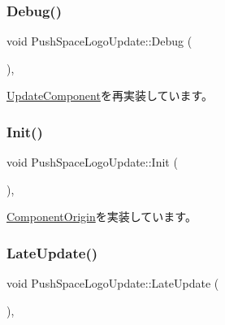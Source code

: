\subsubsection{\texorpdfstring{Debug()}{Debug()}}
{\footnotesize\ttfamily void Push\+Space\+Logo\+Update\+::\+Debug (\begin{DoxyParamCaption}{ }\end{DoxyParamCaption})\hspace{0.3cm}{\ttfamily [override]}, {\ttfamily [virtual]}}



\mbox{\hyperlink{class_update_component_a636b21061765a1101600c3ad70fadeac}{Update\+Component}}を再実装しています。

\mbox{\label{class_push_space_logo_update_a9c165604160c012b429c1db1d67ffb2a}} 
\subsubsection{\texorpdfstring{Init()}{Init()}}
{\footnotesize\ttfamily void Push\+Space\+Logo\+Update\+::\+Init (\begin{DoxyParamCaption}{ }\end{DoxyParamCaption})\hspace{0.3cm}{\ttfamily [override]}, {\ttfamily [virtual]}}



\mbox{\hyperlink{class_component_origin_a9f674891257f2272b1636d8b6bb05d81}{Component\+Origin}}を実装しています。

\mbox{\label{class_push_space_logo_update_a4423864fb22b1211e92a4317d0b70a44}} 
\subsubsection{\texorpdfstring{Late\+Update()}{LateUpdate()}}
{\footnotesize\ttfamily void Push\+Space\+Logo\+Update\+::\+Late\+Update (\begin{DoxyParamCaption}{ }\end{DoxyParamCaption})\hspace{0.3cm}{\ttfamily [override]}, {\ttfamily [virtual]}}



